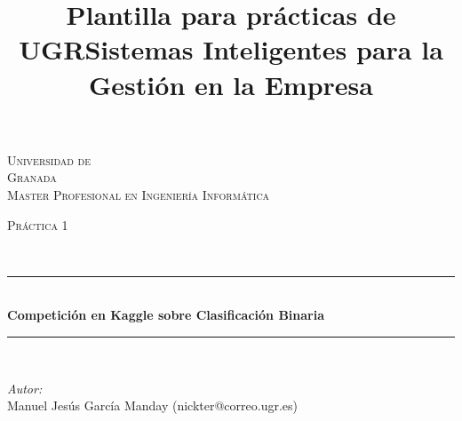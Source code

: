 \documentclass[10pt]{article}
\title{Plantilla para prácticas de UGR}
\title{Sistemas Inteligentes para la Gestión en la Empresa}
\begin{document}
\begin{center}																		%
\newcommand{\HRule}{\rule{\linewidth}{0.5mm}}									%
\begin{minipage}{0.48\textwidth} \begin{flushleft}
\end{flushleft}\end{minipage}
\begin{minipage}{0.48\textwidth} \begin{flushright}
\end{flushright}\end{minipage}

\vspace*{-1.5cm}								%
\textsc{\huge Universidad de\\ \vspace{5px} Granada}\\[1.5cm]	

\textsc{\LARGE Master Profesional en Ingenier\'ia Inform\'atica }\\[1.5cm]													%

\begin{minipage}{0.9\textwidth} 
\begin{center}																					%
\textsc{\LARGE Pr\'actica 1}
\end{center}
\end{minipage}\\[0.5cm]
 			\vspace*{1cm}																		%
\HRule \\[0.4cm]																	%
{ \huge \bfseries Competición en Kaggle sobre Clasificación Binaria}\\[0.4cm]	%
\HRule \\[1.5cm]																	%
\begin{minipage}{0.46\textwidth}													%
\begin{flushleft} \large															%
\emph{Autor:}\\	
Manuel Jes\'us Garc\'ia Manday (nickter@correo.ugr.es)\\
\end{flushleft}																		%
\end{minipage}		
\begin{minipage}{0.52\textwidth}		
\vspace{-0.6cm}											%
\begin{flushright} \large															%
\end{flushright}																	%
\end{minipage}	
\vspace*{1cm}
 	

\end{center}
\end{document}
